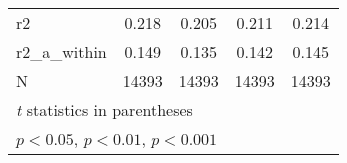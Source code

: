 {\begin{tabular}{l*{4}{c}}
\hline
r2          &       0.218         &       0.205         &       0.211         &       0.214         \\
r2\_a\_within &       0.149         &       0.135         &       0.142         &       0.145         \\
N           &       14393         &       14393         &       14393         &       14393         \\
\hline\hline
\multicolumn{5}{l}{\footnotesize \textit{t} statistics in parentheses}\\
\multicolumn{5}{l}{\footnotesize \sym{*} \(p<0.05\), \sym{**} \(p<0.01\), \sym{***} \(p<0.001\)}\\
\end{tabular}
}
